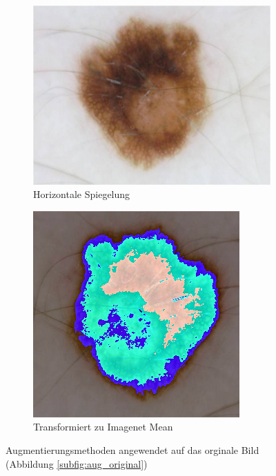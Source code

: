 \begin{figure}[t!]
\begin{subfigure}{0.24\linewidth}
		\includegraphics[width=\textwidth]{./pics/augmentations/horizontal_flip.png}
		\caption{Horizontale Spiegelung}
		\label{subfig:aug_h_flip}
	\end{subfigure}
	\begin{subfigure}{0.24\linewidth}
		\includegraphics[width=\textwidth]{./pics/augmentations/img_norm.png}
		\caption{Transformiert zu Imagenet Mean}
		\label{subfig:aug_h_flip}
	\end{subfigure}
	\caption{Augmentierungsmethoden angewendet auf das orginale Bild (Abbildung \ref{subfig:aug_original})}
\end{figure}


